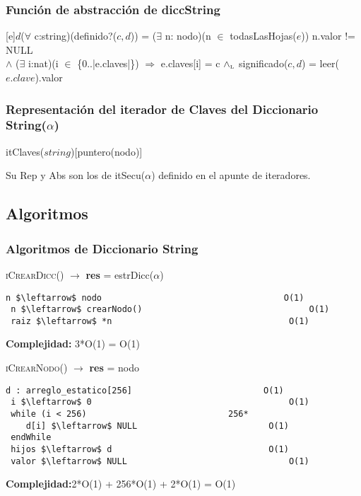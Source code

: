 
\subsubsection{Funci\'on de abstracci\'on de diccString}
 [e]{$d$}{($\forall$ c:string)(definido?($c,d$)) = ($\exists$ n: nodo)(n $\in$ todasLasHojas($e$)) n.valor != NULL \\ $\land$ ($\exists$ i:nat)(i $\in$ \{0..|e.claves|\}) $\Rightarrow$ e.claves[i] = c $\land_{\mathrm{\scriptscriptstyle{L}}}$ significado($c,d$) = leer($e.clave$).valor}

  \subsubsection{Representaci\'on del iterador de Claves del Diccionario String($\alpha$)}



    \begin{Estructura}{itClaves($string$)}[puntero(nodo)]
    \end{Estructura}

    Su Rep y Abs son los de itSecu($\alpha$) definido en el apunte de iteradores.

  \subsection{Algoritmos}
\subsubsection{Algoritmos de Diccionario String}

\textsc{iCrearDicc}() $\rightarrow$ \textbf{res} = estrDicc($\alpha$)
\begin{lstlisting}[mathescape]
 n $\leftarrow$ nodo									O(1)
 n $\leftarrow$ crearNodo() 								O(1)
 raiz $\leftarrow$ *n 									O(1)
\end{lstlisting}
\textbf{Complejidad:} 3*O(1) = O(1)

\textsc{iCrearNodo}() $\rightarrow$ \textbf{res} = nodo
\begin{lstlisting}[mathescape]
 d : arreglo_estatico[256] 							O(1)
 i $\leftarrow$ 0 										O(1)
 while (i < 256) 							256*
 	d[i] $\leftarrow$ NULL 							O(1)
 endWhile
 hijos $\leftarrow$ d 								O(1)
 valor $\leftarrow$ NULL 								O(1)
\end{lstlisting}
\textbf{Complejidad:}2*O(1) + 256*O(1) + 2*O(1) = O(1)

